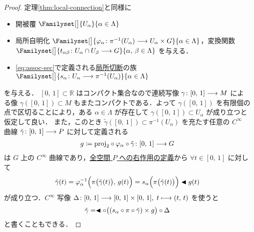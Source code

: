 \documentclass[geometry_main]{subfiles}
\begin{document}
\begin{proof}
    定理\ref{thm:local-connection}と同様に
    \begin{itemize}
        \item 開被覆 $\Familyset[\big]{U_\alpha}{\alpha \in \Lambda}$
        \item 局所自明化 $\Familyset[\big]{\varphi_\alpha \colon \pi^{-1}(U_\alpha) \lto U_\alpha \times G}{\alpha \in \Lambda}$，変換関数 $\Familyset[\big]{t_{\alpha\beta} \colon U_\alpha \cap U_\beta \lto G}{\alpha,\, \beta \in \Lambda}$ を与える．
        \item \eqref{eq:assoc-sec}で定義される\hyperref[def.section]{局所切断}の族 $\Familyset[\big]{s_\alpha \colon U_\alpha \lto \pi^{-1}(U_\alpha)}{\alpha \in \Lambda}$
    \end{itemize}
    を与える．
    $[0,\, 1] \subset \mathbb{R}$ はコンパクト集合なので連続写像 $\gamma \colon [0,\, 1] \longrightarrow M$ による像 $\gamma ([0,\, 1]) \subset M$ もまたコンパクトである．よって $\gamma([0,\, 1])$ を有限個の点で区切ることにより，ある $\alpha \in \Lambda$ が存在して $\gamma([0,\, 1]) \subset U_\alpha$ が成り立つと仮定して良い．
    また，このとき $\tilde{\gamma} ([0,\, 1]) \subset \pi^{-1}(U_\alpha)$ を充たす任意の $C^\infty$ 曲線 $\tilde{\gamma} \colon [0,\, 1] \longrightarrow P$ に対して定義される
    \begin{align}
        g \coloneqq \mathrm{proj}_2 \circ \varphi_\alpha \circ \tilde{\gamma} \colon [0,\, 1] \longrightarrow G
    \end{align}
    は $G$ 上の $C^\infty$ 曲線であり，\hyperref[prop.PFD_right]{全空間 $P$ への右作用の定義}から $\forall t \in [0,\, 1]$ に対して
    \begin{align}
        \tilde{\gamma}(t) = \varphi_\alpha^{-1} \Bigl( \pi\bigl(\tilde{\gamma}(t)\bigr),\, g(t) \Bigr) = s_\alpha \Bigl( \pi \bigl( \tilde{\gamma}(t) \bigr) \Bigr) \blacktriangleleft g(t)
    \end{align}
    が成り立つ．$C^\infty$ 写像 $\Delta \colon [0,\, 1] \longrightarrow [0,\, 1] \times [0,\, 1],\; t \longmapsto (t,\, t)$ を使うと
    \begin{align}
        \label{eq:horizontal-lift-curve-1}
        \tilde{\gamma} = \blacktriangleleft \circ \bigl( (s_\alpha \circ \pi \circ \tilde{\gamma}) \times g \bigr) \circ \Delta
    \end{align}
    と書くこともできる．


\end{proof}
\end{document}
